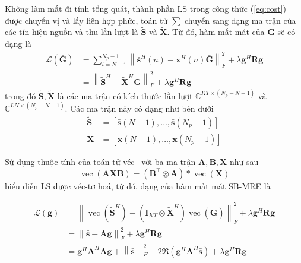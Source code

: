 Không làm mất đi tính tổng quát, thành phần LS trong công thức (\ref{eq:cost}) được chuyển vị và lấy liên hợp phức, toán tử $\sum$ chuyển sang dạng ma trận của các tín hiệu nguồn và thu lần lượt là $\widetilde{\mathbf{S}}$ và $\widetilde{\mathbf{X}}$. Từ đó, hàm mất mát của $\bar{\mathbf{G}}$ sẽ có dạng là
\begin{equation}
    \begin{aligned}
    \mathcal{L}(\bar{\mathbf{G}})&=\sum_{i=N-1}^{N_{p} - 1}\left\|{\bar{\mathbf{s}}^H(n)}- \mathbf{x}^H(n) \bar{\mathbf{G}}\right\|^2_F +\lambda \mathbf{g}^H \mathbf{R} \mathbf{g}\\
    &=\left\|\widetilde{\mathbf{S}}^H-\widetilde{\mathbf{X}}^H \bar{\mathbf{G}}\right\|^2_F +\lambda \mathbf{g}^H \mathbf{R} \mathbf{g}
    \end{aligned}
\end{equation}
trong đó $\widetilde{\mathbf{S}}, \widetilde{\mathbf{X}}$ là các ma trận có kích thước lần lượt $\mathbb{C}^{KT \times (N_p -N +1)}$ và $\mathbb{C}^{LN \times (N_p-N+1)}$. Các ma trận này có dạng như bên dưới
\begin{equation}
    \begin{aligned}
        \widetilde{\mathbf{S}} &= [\bar{\mathbf{s}}(N-1), \ldots, \bar{\mathbf{s}}\left(N_{p} - 1\right)] \\
        \widetilde{\mathbf{X}} &= [\mathbf{x}(N-1), \ldots, \mathbf{x}\left(N_{p} - 1\right)]
    \end{aligned}
\end{equation}

Sử dụng thuộc tính của toán tử véc~\cite{Minka2000} với ba ma trận $\mathbf{A, B, X}$ như sau
\begin{equation}
    \operatorname{vec}(\mathbf{AXB}) = (\mathbf{B}^\top \otimes \mathbf{A}) * \operatorname{vec}(\mathbf{X})
\end{equation}
biểu diễn LS được véc-tơ hoá, từ đó, dạng của hàm mất mát SB-MRE là

\begin{equation}
\label{eq:cost_final}
    \begin{aligned}
    \mathcal{L}(\mathbf{g}) &= \left\|\operatorname{vec}(\widetilde{\mathbf{S}}^H) - (\mathbf{I}_{KT} \otimes \widetilde{\mathbf{X}}^H) \operatorname{vec}(\bar{\mathbf{G}})\right\|^2_F + \lambda \mathbf{g}^H \mathbf{R} \mathbf{g}\\
         &= \left\| \bar{\mathbf{s}} - \mathbf{A} \mathbf{g} \right\|^2_F + \lambda \mathbf{g}^H \mathbf{R} \mathbf{g} \\
         &= \mathbf{g}^H \mathbf{A}^H \mathbf{A} \mathbf{g} + \left\| \bar{\mathbf{s}} \right\|^2_F - 2\Re (\mathbf{g}^H \mathbf{A}^H \bar{\mathbf{s}}) + \lambda \mathbf{g}^H \mathbf{R} \mathbf{g}    \end{aligned}
\end{equation}

